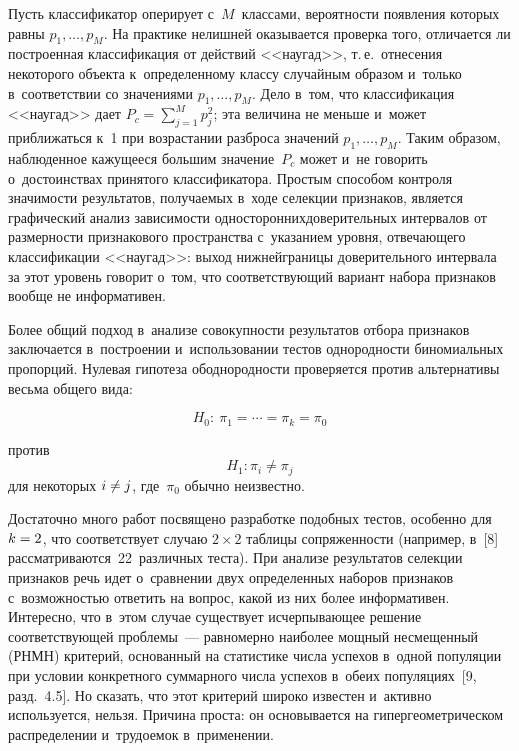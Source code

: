 \begin{multicols}{2}
     Пусть классификатор оперирует с~$M$~классами, вероятности 
появления которых равны $p_1,\ldots, p_M$. На практике нелишней 
оказывается проверка того, отличается ли построенная классификация от 
действий <<наугад>>, т.\,е.\ отнесения некоторого объекта к~определенному 
классу случайным образом и~только в~соответствии со значениями $p_1,\ldots, 
p_M$. Дело в~том, что классификация <<наугад>> дает $P_c=\sum_{j=1}^M 
p_j^2$; эта величина не меньше  и~может приближаться к~1 при возрастании 
разброса значений $p_1,\ldots, p_M$. Таким образом, наблюденное кажущееся 
большим значение~$P_c$ может и~не говорить о~достоинствах принятого 
классификатора. Прос\-тым способом контроля значимости результатов, 
получаемых в~ходе селекции признаков, является графический анализ 
зависимости односторонних\linebreak доверительных интервалов от размерности 
признакового пространства с~указанием уровня, от\-ве\-ча\-юще\-го классификации 
<<наугад>>: выход нижней\linebreak границы доверительного интервала за этот уровень 
говорит о~том, что соответствующий вариант набора признаков вообще не 
информативен. 
     
     Более общий подход в~анализе совокупности результатов отбора 
признаков заключается в~по\-стро\-ении и~использовании тестов однородности 
биномиальных пропорций. Нулевая гипотеза об\linebreak однород\-ности проверяется 
против альтернативы весьма общего вида:

\vspace*{4pt}

\noindent
$$
  H_0:\ \pi_1=\cdots =\pi_k=\pi_0
  $$
  
  \vspace*{-4pt}
  
\noindent
  против 
  $$ H_1: \pi_i\not= \pi_j
    $$
  для некоторых  $i\hm\not=j$,
где~$\pi_0$ обычно неизвестно.

     Достаточно много работ посвящено разработке подобных тестов, 
особенно для $k\hm=2$, что соответствует случаю $2\times2$ таблицы 
сопряженности (например, в~[8] рассматриваются~22~различных тес\-та). При 
анализе результатов селекции признаков речь идет о~сравнении двух 
определенных наборов признаков с~возможностью ответить на вопрос, какой из 
них более информативен. Интересно, что в~этом случае существует 
исчерпыва\-ющее решение соответствующей проблемы~--- равномерно наиболее 
мощный несмещенный (РНМН)  критерий, основанный на статистике числа 
успехов в~одной популяции при условии конкретного суммарного числа 
успехов в~обеих популяциях~[9, разд.~4.5]. Но сказать, что этот критерий 
широко известен и~активно используется, нельзя. Причина проста: он 
основывается на гипергеометрическом распределении и~трудоемок 
в~применении. 


\end{multicols}
